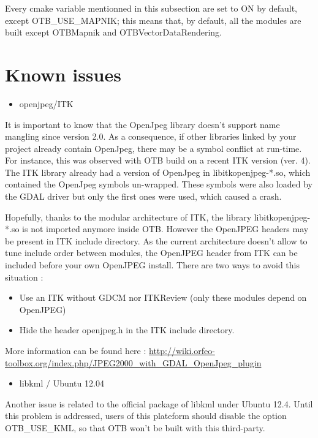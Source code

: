 Every cmake variable mentionned in this subsection are set to ON by default, except OTB\_USE\_MAPNIK; this means that, by default, all the modules are built except OTBMapnik and OTBVectorDataRendering.


\section{Known issues}
\label{sec:knownissues}

\begin{itemize}
\item  openjpeg/ITK 
\end{itemize}

It is important to know that the OpenJpeg library doesn't support name mangling since version 2.0. 
As a consequence, if other libraries linked by your project already contain OpenJpeg, there may be a symbol conflict at run-time. 
For instance, this was observed with OTB build on a recent ITK version (ver. 4). 
The ITK library already had a version of OpenJpeg in libitkopenjpeg-*.so, which contained the OpenJpeg symbols un-wrapped.
These symbols were also loaded by the GDAL driver but only the first ones were used, which caused a crash. 

Hopefully, thanks to the modular architecture of ITK, the library libitkopenjpeg-*.so is not imported anymore inside OTB.
However the OpenJPEG headers may be present in ITK include directory. As the current architecture doesn't allow to tune 
include order between modules, the OpenJPEG header from ITK can be included before your own OpenJPEG install. There are
two ways to avoid this situation :
\begin{itemize}
\item Use an ITK without GDCM nor ITKReview (only these modules depend on OpenJPEG)
\item Hide the header openjpeg.h in the ITK include directory.
\end{itemize}

More information can be found here : \url{http://wiki.orfeo-toolbox.org/index.php/JPEG2000_with_GDAL_OpenJpeg_plugin}

\begin{itemize}
\item  libkml / Ubuntu 12.04 
\end{itemize}

Another issue is related to the official package of libkml under Ubuntu 12.4.
Until this problem is addressed, users of this plateform should disable the option OTB\_USE\_KML, so that OTB won't be built with this third-party.



